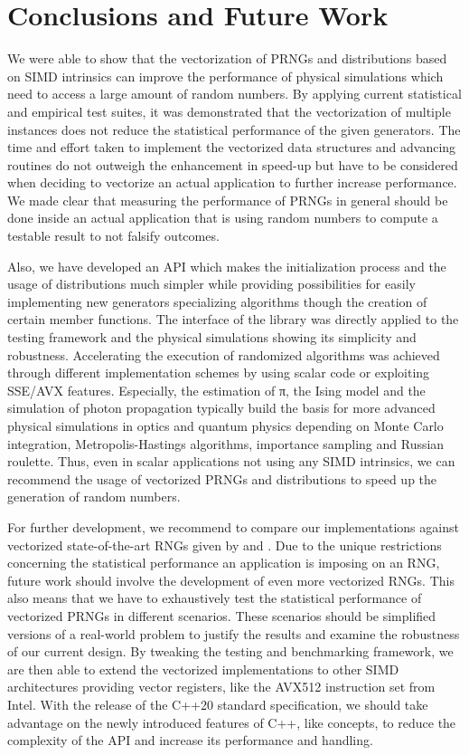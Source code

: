 \documentclass[crop=false]{stdlocal}
\begin{document}
\section{Conclusions and Future Work} %
\label{sec:conclusions}
  We were able to show that the vectorization of PRNGs and distributions based on SIMD intrinsics can improve the performance of physical simulations which need to access a large amount of random numbers.
  By applying current statistical and empirical test suites, it was demonstrated that the vectorization of multiple instances does not reduce the statistical performance of the given generators.
  The time and effort taken to implement the vectorized data structures and advancing routines do not outweigh the enhancement in speed-up but have to be considered when deciding to vectorize an actual application to further increase performance.
  We made clear that measuring the performance of PRNGs in general should be done inside an actual application that is using random numbers to compute a testable result to not falsify outcomes.

  Also, we have developed an API which makes the initialization process and the usage of distributions much simpler while providing possibilities for easily implementing new generators specializing algorithms though the creation of certain member functions.
  The interface of the library was directly applied to the testing framework and the physical simulations showing its simplicity and robustness.
  Accelerating the execution of randomized algorithms was achieved through different implementation schemes by using scalar code or exploiting SSE/AVX features.
  Especially, the estimation of π, the Ising model and the simulation of photon propagation typically build the basis for more advanced physical simulations in optics and quantum physics depending on Monte Carlo integration, Metropolis-Hastings algorithms, importance sampling and Russian roulette.
  Thus, even in scalar applications not using any SIMD intrinsics, we can recommend the usage of vectorized PRNGs and distributions to speed up the generation of random numbers.

  For further development, we recommend to compare our implementations against vectorized state-of-the-art RNGs given by  and .
  Due to the unique restrictions concerning the statistical performance an application is imposing on an RNG, future work should involve the development of even more vectorized RNGs.
  This also means that we have to exhaustively test the statistical performance of vectorized PRNGs in different scenarios.
  These scenarios should be simplified versions of a real-world problem to justify the results and examine the robustness of our current design.
  By tweaking the testing and benchmarking framework, we are then able to extend the vectorized implementations to other SIMD architectures providing vector registers, like the AVX512 instruction set from Intel.
  With the release of the C++20 standard specification, we should take advantage on the newly introduced features of C++, like concepts, to reduce the complexity of the API and increase its performance and handling.
\end{document}
